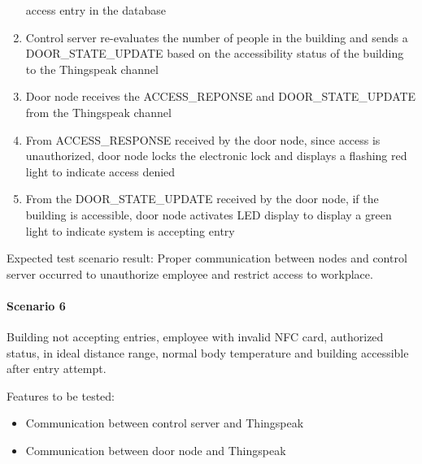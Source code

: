 \begin{enumerate}
          access entry in the database
    \item Control server re-evaluates the number of people in the building and
          sends a DOOR\_STATE\_UPDATE based on the accessibility status of the
          building to the Thingspeak channel
    \item Door node receives the ACCESS\_REPONSE and DOOR\_STATE\_UPDATE from
          the Thingspeak channel
    \item From ACCESS\_RESPONSE received by the door node, since access is
          unauthorized, door node locks the electronic lock and displays a
          flashing red light to indicate access denied 
    \item From the DOOR\_STATE\_UPDATE received by the door node, if the
          building is accessible, door node activates LED display to display a
          green light to indicate system is accepting entry
\end{enumerate}

\noindent
Expected test scenario result: Proper communication between nodes and control
server occurred to unauthorize employee and restrict access to workplace.

\paragraph{Scenario 6}
Building not accepting entries, employee with invalid NFC card, authorized
status, in ideal distance range, normal body temperature and building accessible
after entry attempt.

\noindent
Features to be tested:
\begin{itemize}
    \item Communication between control server and Thingspeak
    \item Communication between door node and Thingspeak
\end{itemize}

